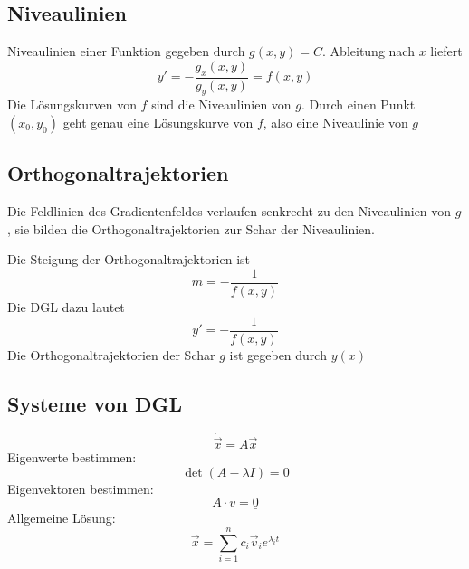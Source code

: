 \documentclass[12pt]{article}
\begin{document}
\begin{multicols*}{3}
			\subsection{Niveaulinien} %
				Niveaulinien einer Funktion gegeben durch $g(x,y) = C$.
				Ableitung nach $x$ liefert
				\[
					y' = - \frac{g_x(x,y)}{g_y(x,y)} = f(x,y)
				\]
				Die Lösungskurven von $f$ sind die Niveaulinien von $g$.
				Durch einen Punkt $(x_0, y_0)$ geht genau eine Lösungskurve von $f$, also eine Niveaulinie von $g$
			\subsection{Orthogonaltrajektorien} %
				Die Feldlinien des Gradientenfeldes verlaufen senkrecht zu den Niveaulinien von $g$, sie bilden die Orthogonaltrajektorien zur Schar der Niveaulinien.
				
				Die Steigung der Orthogonaltrajektorien ist
				\[
					m = - \frac{1}{f(x,y)}
				\]
				Die DGL dazu lautet
				\[
					y' = - \frac{1}{f(x,y)}
				\]
				Die Orthogonaltrajektorien der Schar $g$ ist gegeben durch $y(x)$
			\subsection{Systeme von DGL} %
				\[
					\dot{\vec{x}} = A \vec{x}
				\]
				Eigenwerte bestimmen:
				\[
					\det(A - \lambda I) = 0
				\]
				Eigenvektoren bestimmen:
				\[
					A \cdot v = \underline{0}
				\]
				Allgemeine Lösung:
				\[
					\vec{x} = \sum_{i=1}^n c_i \vec{v}_i e^{\lambda_i t}
				\]
				

\end{multicols*}
\end{document}
